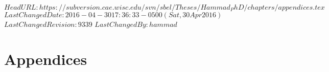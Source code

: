\svnidlong
{$HeadURL: https://subversion.cae.wisc.edu/svn/sbel/Theses/Hammad_PhD/chapters/appendices.tex $}
{$LastChangedDate: 2016-04-30 17:36:33 -0500 (Sat, 30 Apr 2016) $}
{$LastChangedRevision: 9339 $}
{$LastChangedBy: hammad $}
\chapter{Appendices}


%




